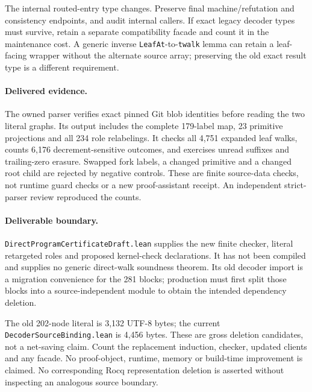 The internal routed-entry type changes. Preserve final machine/refutation and
consistency endpoints, and audit internal callers. If exact legacy decoder
types must survive, retain a separate compatibility facade and count it in
the maintenance cost. A generic inverse \texttt{LeafAt}-to-\texttt{twalk}
lemma can retain a leaf-facing wrapper without the alternate source array;
preserving the old exact result type is a different requirement.

\paragraph{Delivered evidence.}
The owned parser verifies exact pinned Git blob identities before reading
the two literal graphs. Its output includes the complete 179-label map,
23 primitive projections and all 234 role relabelings. It checks all 4,751
expanded leaf walks, counts 6,176 decrement-sensitive outcomes, and exercises
unread suffixes and trailing-zero erasure. Swapped fork labels, a changed
primitive and a changed root child are rejected by negative controls. These
are finite source-data checks, not runtime guard checks or a new proof-assistant
receipt. An independent strict-parser review reproduced the counts.

\paragraph{Deliverable boundary.}
\texttt{DirectProgramCertificateDraft.lean} supplies the new finite checker,
literal retargeted roles and proposed kernel-check declarations. It has not
been compiled and supplies no generic direct-walk soundness theorem. Its old
decoder import is a migration convenience for the 281 blocks; production must
first split those blocks into a source-independent module to obtain the
intended dependency deletion.

The old 202-node literal is 3,132 UTF-8 bytes; the current
\texttt{DecoderSourceBinding.lean} is 4,456 bytes. These are gross deletion
candidates, not a net-saving claim. Count the replacement induction, checker,
updated clients and any facade. No proof-object, runtime, memory or build-time
improvement is claimed. No corresponding Rocq representation deletion is
asserted without inspecting an analogous source boundary.
